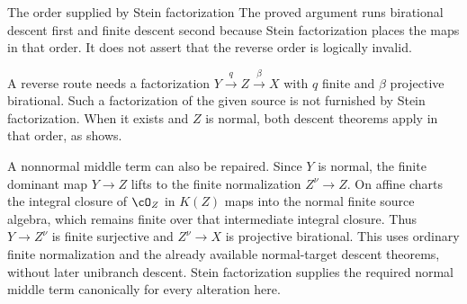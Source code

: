 \begin{warning}{The order supplied by Stein factorization}
\label{warn:ch42-order}
The proved argument runs birational descent first and finite descent
second because Stein factorization places the maps in that order.
It does not assert that the reverse order is logically invalid.

A reverse route needs a factorization
$Y\xrightarrow{q}Z\xrightarrow{\beta}X$ with $q$ finite and
$\beta$ projective birational.  Such a factorization of the given
source is not furnished by Stein factorization.
When it exists and $Z$ is normal, both descent theorems apply
in that order, as  shows.

A nonnormal middle term can also be repaired.  Since $Y$ is normal,
the finite dominant map $Y\to Z$ lifts to the finite normalization
$Z^\nu\to Z$.  On affine charts the integral closure of $\cO_Z$
in $K(Z)$ maps into the normal finite source algebra, which remains
finite over that intermediate integral closure.  Thus $Y\to Z^\nu$
is finite surjective and $Z^\nu\to X$ is projective birational.
This uses ordinary finite normalization and the already available
normal-target descent theorems, without later unibranch descent.
Stein factorization supplies the required normal middle term
canonically for every alteration here.
\end{warning}

